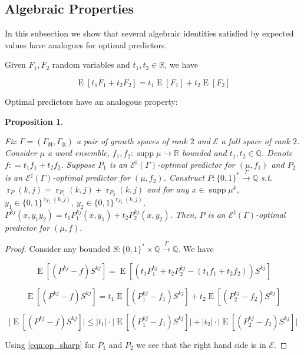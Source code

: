 \documentclass{article}
\numberwithin{equation}{section}
\theoremstyle{definition}
\theoremstyle{plain}
\newtheorem{proposition}{Proposition}[section]
\newcommand{\Words}{{\{ 0, 1 \}^*}}
\newcommand{\WordsLen}[1]{{\{ 0, 1 \}^{#1}}}
\DeclareMathOperator{\Supp}{supp}
\DeclareMathOperator{\E}{E}
\DeclareMathOperator{\R}{r}
\newcommand{\Rats}{\mathbb{Q}}
\newcommand{\Reals}{\mathbb{R}}
\newcommand{\Abs}[1]{\lvert #1 \rvert}
\newcommand{\GrowR}{\Gamma_{\mathfrak{R}}}
\newcommand{\GrowA}{\Gamma_{\mathfrak{A}}}
\newcommand{\Fall}{\mathcal{E}}
\newcommand{\Scheme}{\xrightarrow{\Gamma}}
\begin{document}
\subsection{Algebraic Properties}

In this subsection we show that several algebraic identities satisfied by expected values have analogues for optimal predictors.

Given $F_1,F_2$ random variables and $t_1,t_2 \in \Reals$, we have 

\begin{equation}
\E[t_1 F_1 + t_2 F_2] = t_1 \E[F_1] + t_2 \E[F_2]
\end{equation}

Optimal predictors have an analogous property:

\begin{proposition}
\label{prp:linearity}

Fix $\Gamma=(\GrowR,\GrowA)$ a pair of growth spaces of rank $2$ and $\Fall$ a fall space of rank $2$. Consider $\mu$ a word ensemble, $f_1,f_2: \Supp \mu \rightarrow \Reals$ bounded and $t_1,t_2 \in \Rats$. Denote $f: = t_1 f_1 + t_2 f_2$. Suppose $P_1$ is an $\Fall^\sharp(\Gamma)$-optimal predictor for $(\mu,f_1)$ and $P_2$ is an $\Fall^\sharp(\Gamma)$-optimal predictor for $(\mu,f_2)$. Construct $P: \Words \Scheme \Rats$ s.t. $\R_P(k,j) = \R_{P_1}(k,j) + \R_{P_2}(k,j)$ and for any $x \in \Supp \mu^k$, $y_1 \in \WordsLen{\R_{P_1}(k,j)}$, $y_2 \in \WordsLen{\R_{P_1}(k,j)}$, $P^{kj}(x,y_1 y_2)=t_1 P_1^{kj}(x,y_1) + t_2 P_2^{kj}(x, y_2)$. Then, $P$ is an $\Fall^\sharp(\Gamma)$-optimal predictor for $(\mu, f)$.

\end{proposition}

\begin{proof}

Consider any bounded $S: \Words \times \Rats \Scheme \Rats$. We have

$$\E[(P^{kj} - f)S^{kj}] = \E[(t_1 P_1^{kj} + t_2 P_2^{kj} - (t_1 f_1 + t_2 f_2))S^{kj}]$$

$$\E[(P^{kj} - f)S^{kj}] = t_1 \E[(P_1^{kj} - f_1)S^{kj}] + t_2 \E[(P_2^{kj} - f_2)S^{kj}]$$

$$\Abs{\E[(P^{kj} - f)S^{kj}]} \leq \Abs{t_1} \cdot \Abs{\E[(P_1^{kj} - f_1)S^{kj}]} + \Abs{t_2} \cdot \Abs{\E[(P_2^{kj} - f_2)S^{kj}]}$$

Using \ref{eqn:op_sharp} for $P_1$ and $P_2$ we see that the right hand side is in $\Fall$.

\end{proof}
\end{document}
